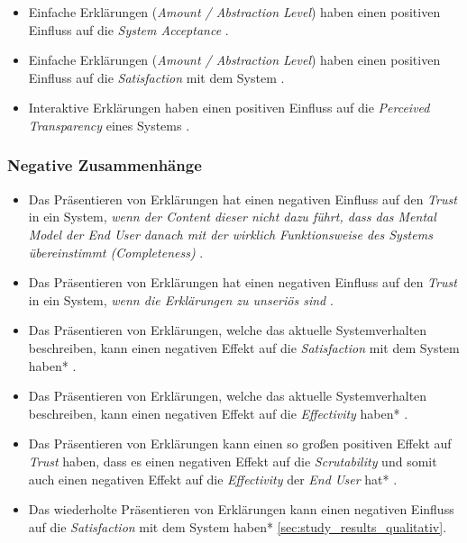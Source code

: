 \begin{itemize}
    \item Einfache Erklärungen (\textit{Amount / Abstraction Level}) haben einen positiven Einfluss auf die \textit{System Acceptance} \cite{hleg2019policy, sovrano_modelling_2020}.
    \item Einfache Erklärungen (\textit{Amount / Abstraction Level}) haben einen positiven Einfluss auf die \textit{Satisfaction} mit dem System \cite{hleg2019policy, sovrano_modelling_2020}.
    \item Interaktive Erklärungen haben einen positiven Einfluss auf die \textit{Perceived Transparency} eines Systems \cite{cheng2019explaining}.
\end{itemize}



\subsubsection*{Negative Zusammenhänge}

\begin{itemize}
    \item Das Präsentieren von Erklärungen hat einen negativen Einfluss auf den \textit{Trust} in ein System, \textit{wenn der Content dieser nicht dazu führt, dass das Mental Model der End User danach mit der wirklich Funktionsweise des Systems übereinstimmt (Completeness)} \cite{schrills_color_2020, chazette_end-users_nodate}.
    \item Das Präsentieren von Erklärungen hat einen negativen Einfluss auf den \textit{Trust} in ein System, \textit{wenn die Erklärungen zu unseriös sind} \cite{wang_is_2018}.
    \item Das Präsentieren von Erklärungen, welche das aktuelle Systemverhalten beschreiben, kann einen negativen Effekt auf die \textit{Satisfaction} mit dem System haben* \cite{koo_why_2015}.
    \item Das Präsentieren von Erklärungen, welche das aktuelle Systemverhalten beschreiben, kann einen negativen Effekt auf die \textit{Effectivity} haben* \cite{koo_why_2015}.
    \item Das Präsentieren von Erklärungen kann einen so großen positiven Effekt auf \textit{Trust} haben, dass es einen negativen Effekt auf die \textit{Scrutability} und somit auch einen negativen Effekt auf die \textit{Effectivity} der \textit{End User} hat* \cite{kohl_explainability_2019, gunning2019darpa}.
    \item Das wiederholte Präsentieren von Erklärungen kann einen negativen Einfluss auf die \textit{Satisfaction} mit dem System haben* \autoref{sec:study_results_qualitativ}.
\end{itemize}


